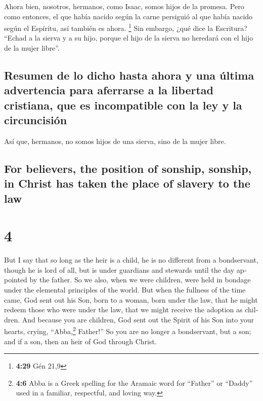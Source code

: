 \begin{paracol}{2}
 Ahora bien, nosotros, hermanos, como Isaac, somos hijos
de la promesa.  Pero como entonces, el que había nacido
según la carne persiguió al que había nacido según el Espíritu, así
también es ahora. \footnote{\textbf{4:29} Gén 21,9}  Sin
embargo, ¿qué dice la Escritura? ``Echad a la sierva y a su hijo, porque
el hijo de la sierva no heredará con el hijo de la mujer libre''.

\hypertarget{resumen-de-lo-dicho-hasta-ahora-y-una-uxfaltima-advertencia-para-aferrarse-a-la-libertad-cristiana-que-es-incompatible-con-la-ley-y-la-circuncisiuxf3n}{%
\subsection{Resumen de lo dicho hasta ahora y una última advertencia
para aferrarse a la libertad cristiana, que es incompatible con la ley y
la
circuncisión}\label{resumen-de-lo-dicho-hasta-ahora-y-una-uxfaltima-advertencia-para-aferrarse-a-la-libertad-cristiana-que-es-incompatible-con-la-ley-y-la-circuncisiuxf3n}}

 Así que, hermanos, no somos hijos de una sierva, sino de
la mujer libre.

\switchcolumn
\begin{otherlanguage}{english}

\hypertarget{for-believers-the-position-of-sonship-sonship-in-christ-has-taken-the-place-of-slavery-to-the-law}{%
\subsection{For believers, the position of sonship, sonship, in Christ
has taken the place of slavery to the
law}\label{for-believers-the-position-of-sonship-sonship-in-christ-has-taken-the-place-of-slavery-to-the-law}}

\hypertarget{section-7}{%
\section{4}\label{section-7}}

 But I say that so long as the heir is a child, he is no
different from a bondservant, though he is lord of all, 
but is under guardians and stewards until the day appointed by the
father.  So we also, when we were children, were held in
bondage under the elemental principles of the world.  But
when the fullness of the time came, God sent out his Son, born to a
woman, born under the law,  that he might redeem those who
were under the law, that we might receive the adoption as children.
 And because you are children, God sent out the Spirit of
his Son into your hearts, crying, ``Abba,\footnote{\textbf{4:6} Abba is
  a Greek spelling for the Aramaic word for ``Father'' or ``Daddy'' used
  in a familiar, respectful, and loving way.} Father!'' 
So you are no longer a bondservant, but a son; and if a son, then an
heir of God through Christ.


\end{otherlanguage}
\end{paracol}
